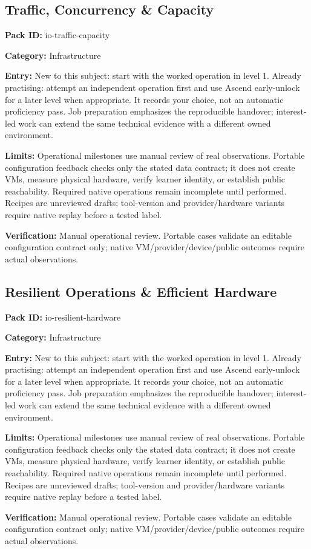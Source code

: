 \subsection{Traffic, Concurrency \& Capacity}
\noindent\textbf{Pack ID:} io-traffic-capacity\par
\noindent\textbf{Category:} Infrastructure\par
\noindent\textbf{Entry:} New to this subject: start with the worked operation in level 1. Already practising: attempt an independent operation first and use Ascend early-unlock for a later level when appropriate. It records your choice, not an automatic proficiency pass. Job preparation emphasizes the reproducible handover; interest-led work can extend the same technical evidence with a different owned environment.\par
\noindent\textbf{Limits:} Operational milestones use manual review of real observations. Portable configuration feedback checks only the stated data contract; it does not create VMs, measure physical hardware, verify learner identity, or establish public reachability. Required native operations remain incomplete until performed. Recipes are unreviewed drafts; tool-version and provider/hardware variants require native replay before a tested label.\par
\noindent\textbf{Verification:} Manual operational review. Portable cases validate an editable configuration contract only; native VM/provider/device/public outcomes require actual observations.\par
\subsection{Resilient Operations \& Efficient Hardware}
\noindent\textbf{Pack ID:} io-resilient-hardware\par
\noindent\textbf{Category:} Infrastructure\par
\noindent\textbf{Entry:} New to this subject: start with the worked operation in level 1. Already practising: attempt an independent operation first and use Ascend early-unlock for a later level when appropriate. It records your choice, not an automatic proficiency pass. Job preparation emphasizes the reproducible handover; interest-led work can extend the same technical evidence with a different owned environment.\par
\noindent\textbf{Limits:} Operational milestones use manual review of real observations. Portable configuration feedback checks only the stated data contract; it does not create VMs, measure physical hardware, verify learner identity, or establish public reachability. Required native operations remain incomplete until performed. Recipes are unreviewed drafts; tool-version and provider/hardware variants require native replay before a tested label.\par
\noindent\textbf{Verification:} Manual operational review. Portable cases validate an editable configuration contract only; native VM/provider/device/public outcomes require actual observations.\par
